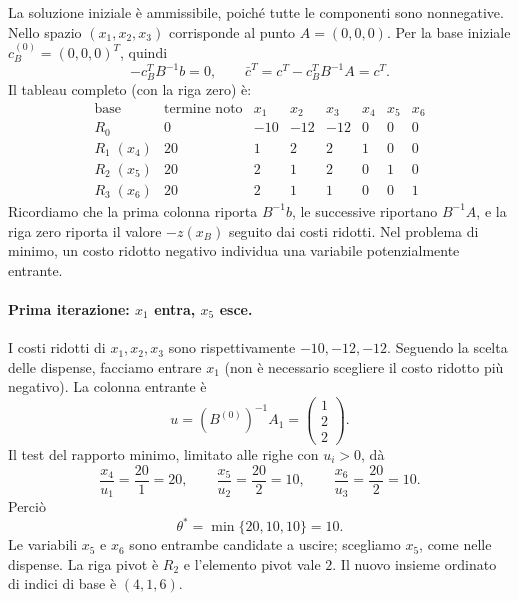 La soluzione iniziale \`e ammissibile, poich\'e tutte le componenti sono nonnegative. Nello spazio $(x_1,x_2,x_3)$ corrisponde al punto $A=(0,0,0)$. Per la base iniziale $c_B^{(0)}=(0,0,0)^T$, quindi
\[
-c_B^T B^{-1}b=0,\qquad
\bar c^T=c^T-c_B^TB^{-1}A=c^T.
\]
Il tableau completo (con la riga zero) \`e:
\[
\begin{array}{c|r|rrrrrr}
\text{base}&\text{termine noto}&x_1&x_2&x_3&x_4&x_5&x_6\\\hline
R_0&0&-10&-12&-12&0&0&0\\\hline
R_1\;(x_4)&20&1&2&2&1&0&0\\
R_2\;(x_5)&20&\boxed{2}&1&2&0&1&0\\
R_3\;(x_6)&20&2&1&1&0&0&1
\end{array}
\]
Ricordiamo che la prima colonna riporta $B^{-1}b$, le successive riportano $B^{-1}A$, e la riga zero riporta il valore $-z(x_B)$ seguito dai costi ridotti. Nel problema di minimo, un costo ridotto negativo individua una variabile potenzialmente entrante.

\paragraph{Prima iterazione: $x_1$ entra, $x_5$ esce.}
I costi ridotti di $x_1,x_2,x_3$ sono rispettivamente $-10,-12,-12$. Seguendo la scelta delle dispense, facciamo entrare $x_1$ (non \`e necessario scegliere il costo ridotto pi\`u negativo). La colonna entrante \`e
\[
u=(B^{(0)})^{-1}A_1=\begin{pmatrix}1\\2\\2\end{pmatrix}.
\]
Il test del rapporto minimo, limitato alle righe con $u_i>0$, d\`a
\[
\frac{x_4}{u_1}=\frac{20}{1}=20,\qquad
\frac{x_5}{u_2}=\frac{20}{2}=10,\qquad
\frac{x_6}{u_3}=\frac{20}{2}=10.
\]
Perci\`o
\[
\theta^*=\min\{20,10,10\}=10.
\]
Le variabili $x_5$ e $x_6$ sono entrambe candidate a uscire; scegliamo $x_5$, come nelle dispense. La riga pivot \`e $R_2$ e l'elemento pivot vale $2$. Il nuovo insieme ordinato di indici di base \`e $(4,1,6)$.

